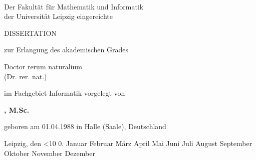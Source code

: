 
\renewcommand{\today}{\ifnum\number\day<10 0\fi \number\day.\space%
\ifcase \month \or Januar \or Februar \or März \or April \or Mai %
\or Juni \or Juli \or August \or September \or Oktober \or November \or Dezember \fi %
\number \year} 

\begin{titlepage}
	\begin{addmargin}[-1cm]{-3cm}
    \begin{center}
        \large  

        \hfill

        \vfill

        \begingroup
            \color{Maroon}\LARGE{\spacedallcaps{\myTitle}} \\ \bigskip
        \endgroup
        
    
        Der Fakultät für Mathematik und Informatik \\
        der Universität Leipzig eingereichte \\\vfill
        
        {\Huge DISSERTATION} \vfill\medskip
    
        zur Erlangung des akademischen Grades \\\vfill
        
        {\LARGE Doctor rerum naturalium}\\
        (Dr. rer. nat.)\\\vfill
        
        im Fachgebiet Informatik vorgelegt von\\\vfill
        
        \textbf{\myName, M.Sc.} \\\vfill
        
        geboren am 01.04.1988 in Halle (Saale), Deutschland \\\vfill
        
        Leipzig, den \today\vfill



        

        
%        
%
%

    \end{center}  
  \end{addmargin}       
\end{titlepage}   
